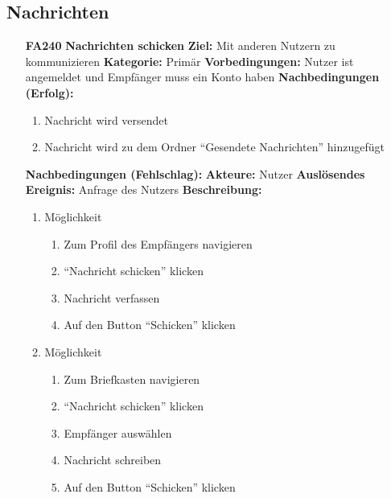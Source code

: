 \documentclass[parskip=full]{scrartcl}
\begin{document}
		\subsection{Nachrichten}
		\begin{itemize}[nosep]
			\item[\textbf{FA240}]\textbf{Nachrichten schicken}
				\newline \textbf{Ziel:} Mit anderen Nutzern zu kommunizieren
				\newline \textbf{Kategorie:} Primär
				\newline \textbf{Vorbedingungen:} Nutzer ist angemeldet und Empfänger muss ein Konto haben
				\newline \textbf{Nachbedingungen (Erfolg):} 
				\begin{enumerate}[nosep]
					\item Nachricht wird versendet
					\item Nachricht wird zu dem Ordner “Gesendete Nachrichten” hinzugefügt
				\end{enumerate}
				\textbf{Nachbedingungen (Fehlschlag):}
				\newline \textbf{Akteure:} Nutzer
				\newline \textbf{Auslösendes Ereignis:} Anfrage des Nutzers
				\newline \textbf{Beschreibung:}
				\begin{enumerate}[nosep]
					\item Möglichkeit
						\begin{enumerate}[nosep]
							\item Zum Profil des Empfängers navigieren
							\item “Nachricht schicken” klicken
							\item Nachricht verfassen
							\item Auf den Button “Schicken” klicken
						\end{enumerate}
					\item Möglichkeit
						\begin{enumerate}[nosep]
							\item Zum Briefkasten navigieren
							\item “Nachricht schicken” klicken
							\item Empfänger auswählen
							\item Nachricht schreiben
							\item Auf den Button “Schicken” klicken\\
						\end{enumerate}
				\end{enumerate}
										

\end{itemize}
\end{document}
